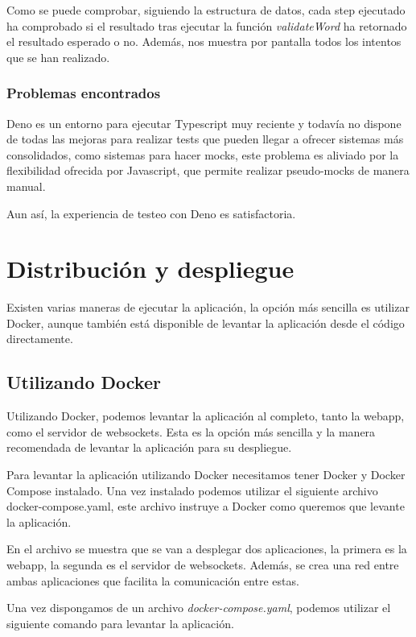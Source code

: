 Como se puede comprobar, siguiendo la estructura de datos, cada step ejecutado ha comprobado si el resultado tras ejecutar la función \textit{validateWord} ha retornado el resultado esperado o no. Además, nos muestra por pantalla todos los intentos que se han realizado.

\subsubsection{Problemas encontrados}
Deno es un entorno para ejecutar Typescript muy reciente y todavía no dispone de todas las mejoras para realizar tests que pueden llegar a ofrecer sistemas más consolidados, como sistemas para hacer mocks, este problema es aliviado por la flexibilidad ofrecida por Javascript, que permite realizar pseudo-mocks de manera manual.

Aun así, la experiencia de testeo con Deno es satisfactoria.

\section{Distribución y despliegue}

Existen varias maneras de ejecutar la aplicación, la opción más sencilla es utilizar Docker, aunque también está disponible de levantar la aplicación desde el código directamente.

\subsection{Utilizando Docker}
Utilizando Docker, podemos levantar la aplicación al completo, tanto la webapp, como el servidor de websockets. Esta es la opción más sencilla y la manera recomendada de levantar la aplicación para su despliegue.

Para levantar la aplicación utilizando Docker necesitamos tener Docker y Docker Compose instalado. Una vez instalado podemos utilizar el siguiente archivo docker-compose.yaml, este archivo instruye a Docker como queremos que levante la aplicación.

En el archivo se muestra que se van a desplegar dos aplicaciones, la primera es la webapp, la segunda es el servidor de websockets. Además, se crea una red entre ambas aplicaciones que facilita la comunicación entre estas.

Una vez dispongamos de un archivo \textit{docker-compose.yaml}, podemos utilizar el siguiente comando para levantar la aplicación.

